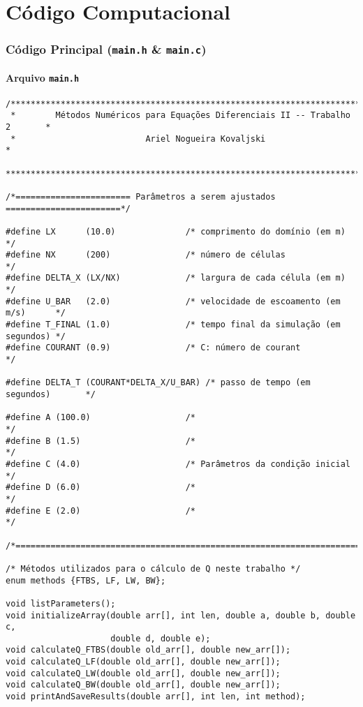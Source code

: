 \chapter{Código Computacional}

\subsection{Código Principal (\texttt{main.h} \& \texttt{main.c})}

\subsubsection{Arquivo \texttt{main.h}}

\begin{Verbatim}[fontsize=\footnotesize]
/******************************************************************************
 *        Métodos Numéricos para Equações Diferenciais II -- Trabalho 2       *
 *                          Ariel Nogueira Kovaljski                          *
 ******************************************************************************/

/*======================= Parâmetros a serem ajustados =======================*/

#define LX      (10.0)              /* comprimento do domínio (em m)          */
#define NX      (200)               /* número de células                      */
#define DELTA_X (LX/NX)             /* largura de cada célula (em m)          */
#define U_BAR   (2.0)               /* velocidade de escoamento (em m/s)      */
#define T_FINAL (1.0)               /* tempo final da simulação (em segundos) */
#define COURANT (0.9)               /* C: número de courant                   */

#define DELTA_T (COURANT*DELTA_X/U_BAR) /* passo de tempo (em segundos)       */

#define A (100.0)                   /*                                */
#define B (1.5)                     /*                                */
#define C (4.0)                     /* Parâmetros da condição inicial */
#define D (6.0)                     /*                                */
#define E (2.0)                     /*                                */

/*============================================================================*/

/* Métodos utilizados para o cálculo de Q neste trabalho */
enum methods {FTBS, LF, LW, BW};

void listParameters();
void initializeArray(double arr[], int len, double a, double b, double c,
                     double d, double e);
void calculateQ_FTBS(double old_arr[], double new_arr[]);
void calculateQ_LF(double old_arr[], double new_arr[]);
void calculateQ_LW(double old_arr[], double new_arr[]);
void calculateQ_BW(double old_arr[], double new_arr[]);
void printAndSaveResults(double arr[], int len, int method);
\end{Verbatim}

